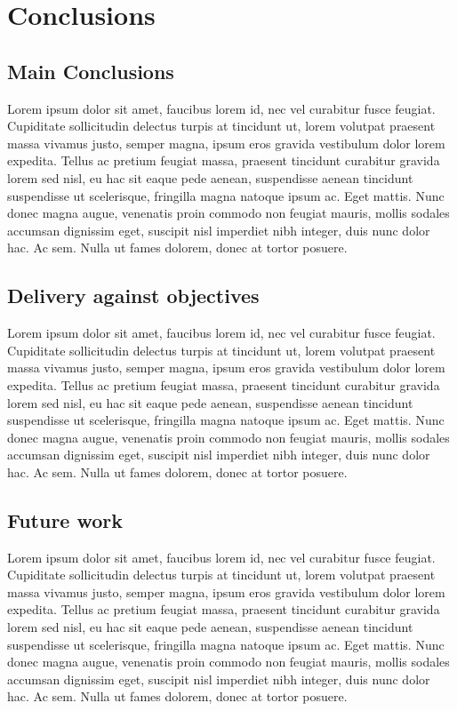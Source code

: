 \chapter{Conclusions}
\section{Main Conclusions}
 Lorem ipsum dolor sit amet, faucibus lorem id, nec vel curabitur fusce feugiat. Cupiditate sollicitudin delectus turpis at tincidunt ut, lorem volutpat praesent massa vivamus justo, semper magna, ipsum eros gravida vestibulum dolor lorem expedita. Tellus ac pretium feugiat massa, praesent tincidunt curabitur gravida lorem sed nisl, eu hac sit eaque pede aenean, suspendisse aenean tincidunt suspendisse ut scelerisque, fringilla magna natoque ipsum ac. Eget mattis. Nunc donec magna augue, venenatis proin commodo non feugiat mauris, mollis sodales accumsan dignissim eget, suscipit nisl imperdiet nibh integer, duis nunc dolor hac. Ac sem. Nulla ut fames dolorem, donec at tortor posuere.
\section{Delivery against objectives}
 Lorem ipsum dolor sit amet, faucibus lorem id, nec vel curabitur fusce feugiat. Cupiditate sollicitudin delectus turpis at tincidunt ut, lorem volutpat praesent massa vivamus justo, semper magna, ipsum eros gravida vestibulum dolor lorem expedita. Tellus ac pretium feugiat massa, praesent tincidunt curabitur gravida lorem sed nisl, eu hac sit eaque pede aenean, suspendisse aenean tincidunt suspendisse ut scelerisque, fringilla magna natoque ipsum ac. Eget mattis. Nunc donec magna augue, venenatis proin commodo non feugiat mauris, mollis sodales accumsan dignissim eget, suscipit nisl imperdiet nibh integer, duis nunc dolor hac. Ac sem. Nulla ut fames dolorem, donec at tortor posuere.
\section{Future work}
 Lorem ipsum dolor sit amet, faucibus lorem id, nec vel curabitur fusce feugiat. Cupiditate sollicitudin delectus turpis at tincidunt ut, lorem volutpat praesent massa vivamus justo, semper magna, ipsum eros gravida vestibulum dolor lorem expedita. Tellus ac pretium feugiat massa, praesent tincidunt curabitur gravida lorem sed nisl, eu hac sit eaque pede aenean, suspendisse aenean tincidunt suspendisse ut scelerisque, fringilla magna natoque ipsum ac. Eget mattis. Nunc donec magna augue, venenatis proin commodo non feugiat mauris, mollis sodales accumsan dignissim eget, suscipit nisl imperdiet nibh integer, duis nunc dolor hac. Ac sem. Nulla ut fames dolorem, donec at tortor posuere.
